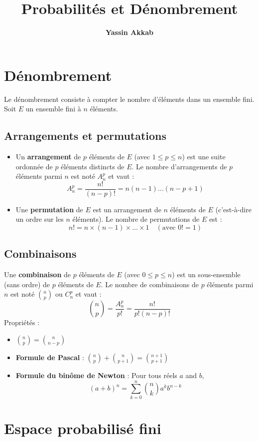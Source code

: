 \documentclass{article}
\title{\textbf{Probabilités et Dénombrement}}
\author{\textbf{Yassin Akkab}}
\begin{document}
	
	\maketitle
	\tableofcontents
	\newpage
	
	\section{Dénombrement}
	Le dénombrement consiste à compter le nombre d'éléments dans un ensemble fini.
	Soit $E$ un ensemble fini à $n$ éléments.
	
	\subsection{Arrangements et permutations}
	\begin{itemize}
		\item Un \textbf{arrangement} de $p$ éléments de $E$ (avec $1 \le p \le n$) est une suite ordonnée de $p$ éléments distincts de $E$.
		Le nombre d'arrangements de $p$ éléments parmi $n$ est noté $A_n^p$ et vaut :
		\[ A_n^p = \frac{n!}{(n-p)!} = n(n-1)\dots(n-p+1) \]
		\item Une \textbf{permutation} de $E$ est un arrangement de $n$ éléments de $E$ (c'est-à-dire un ordre sur les $n$ éléments).
		Le nombre de permutations de $E$ est :
		\[ n! = n \times (n-1) \times \dots \times 1 \quad (\text{avec } 0! = 1) \]
	\end{itemize}
	
	\subsection{Combinaisons}
	Une \textbf{combinaison} de $p$ éléments de $E$ (avec $0 \le p \le n$) est un sous-ensemble (sans ordre) de $p$ éléments de $E$.
	Le nombre de combinaisons de $p$ éléments parmi $n$ est noté $\binom{n}{p}$ ou $C_n^p$ et vaut :
	\[ \binom{n}{p} = \frac{A_n^p}{p!} = \frac{n!}{p!(n-p)!} \]
	Propriétés :
	\begin{itemize}
		\item $\binom{n}{p} = \binom{n}{n-p}$
		\item \textbf{Formule de Pascal} : $\binom{n}{p} + \binom{n}{p+1} = \binom{n+1}{p+1}$
		\item \textbf{Formule du binôme de Newton} : Pour tous réels $a$ and $b$,
		\[ (a+b)^n = \sum_{k=0}^{n} \binom{n}{k} a^k b^{n-k} \]
	\end{itemize}
	
	\section{Espace probabilisé fini}
	
\end{document}
